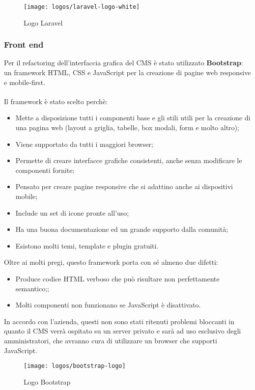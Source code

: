 \begin{figure}[htbp]
\begin{center}
\texttt{[image: logos/laravel-logo-white]}
\caption{Logo Laravel}
\end{center}
\end{figure}

\subsubsection{Front end}
Per il refactoring dell'interfaccia grafica del CMS è stato utilizzato \textbf{Bootstrap}: un framework HTML, CSS e JavaScript per la creazione di pagine web responsive e mobile-first.
\\ \\
Il framework è stato scelto perchè:
\begin{itemize}
	\item Mette a disposizione tutti i componenti base e gli stili utili per la creazione di una pagina web (layout a griglia, tabelle, box modali, form e molto altro);
	\item Viene supportato da tutti i maggiori browser;
	\item Permette di creare interfacce grafiche consistenti, anche senza modificare le componenti fornite;
	\item Pensato per creare pagine responsive che si adattino anche ai dispositivi mobile;
	\item Include un set di icone pronte all'uso;
	\item Ha una buona documentazione ed un grande supporto dalla comunità;
	\item Esistono molti temi, template e plugin gratuiti.
\end{itemize}

Oltre ai molti pregi, questo framework porta con sé almeno due difetti: 
\begin{itemize}
	\item Produce codice HTML verboso che può risultare non perfettamente semantico;;
	\item Molti componenti non funzionano se JavaScript è disattivato.
\end{itemize}

In accordo con l'azienda, questi non sono stati ritenuti problemi bloccanti in quanto il CMS verrà ospitato su un server privato e sarà ad uso esclusivo degli amministratori, che avranno cura di utilizzare un browser che supporti JavaScript.

\begin{figure}[htbp]
\begin{center}
\texttt{[image: logos/bootstrap-logo]}
\caption{Logo Bootstrap}
\end{center}
\end{figure}

